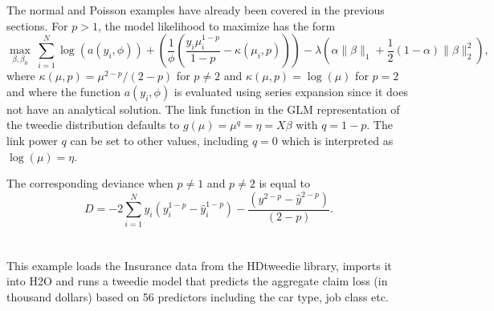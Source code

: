 The normal and Poisson examples have already been covered in the previous sections. For $p>1$, the model likelihood to maximize has the form
$$  \max_{\beta,\beta_0} \ \sum_{i=1}^N \log(a(y_i,\phi)) + \left( \frac{1}{\phi}\left( \frac{y_i\mu_i^{1-p}}{1-p} - \kappa(\mu_i,p) \right)  \right) -\lambda  \left(  \alpha \| \beta \|_1 + \frac{1}{2}(1-\alpha)\| \beta \|_2^2  \right), $$
where $\kappa(\mu,p) = \mu^{2-p}/(2-p)$ for $p \neq 2$ and $\kappa(\mu,p) = \log(\mu)$ for $p=2$ and where the function $a(y_i,\phi)$ is evaluated using series expansion since it does not have an analytical solution. The link function in the GLM representation of the tweedie distribution defaults to $g(\mu) = \mu^{q} = \eta = X\beta$ with $q=1-p$. The link power $q$ can be set to other values, including $q=0$ which is interpreted as $\log(\mu)=\eta$. 
%

The corresponding deviance when $p \neq 1$ and $p\neq 2$ is equal to
$$D = -2 \sum_{i=1}^{N} y_i  (y_i^{1-p} - \hat{y}_i^{1-p} ) - \frac{(y^{2 - p} - \hat{y}^{2 - p})}{(2 - p)}. $$\\

\waterExampleInR
\\
This example loads the Insurance data from the HDtweedie library, imports it into H2O and runs a tweedie model that predicts the aggregate claim loss (in thousand dollars) based on 56 predictors including the car type, job class etc.



%


